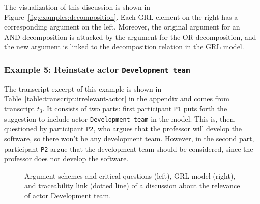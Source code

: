 The visualization of this discussion is shown in Figure~\ref{fig:examples:decomposition}. Each GRL element on the right has a corresponding argument on the left. Moreover, the original argument for an AND-decomposition is attacked by the argument for the OR-decomposition, and the new argument is linked to the decomposition relation in the GRL model.

\subsubsection{Example 5: Reinstate actor \texttt{Development team}}

The transcript excerpt of this example is shown in Table~\ref{table:transcript:irrelevant-actor} in the appendix and comes from transcript $t_3$. It consists of two parts: first participant \texttt{P1} puts forth the suggestion to include actor \texttt{Development team} in the model. This is, then, questioned by participant \texttt{P2}, who argues that the professor will develop the software, so there won't be any development team. However, in the second part, participant \texttt{P2} argue that the development team should be considered, since the professor does not develop the software.

\begin{figure}[ht!]
\centering
\caption{Argument schemes and critical questions (left), GRL model (right), and traceability link (dotted line) of a discussion about the relevance of actor Development team.}
\label{fig:examples:relevant-actor}
\end{figure}

